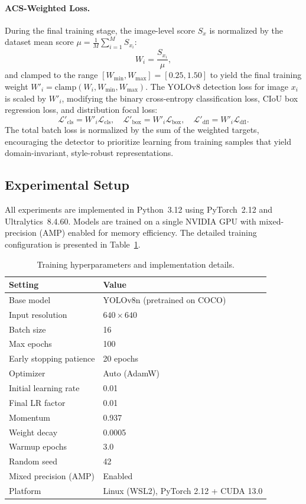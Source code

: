 \documentclass[12pt,a4paper]{article}
\begin{document}
\paragraph{ACS-Weighted Loss.}
During the final training stage, the image-level score $S_x$ is normalized by the dataset mean score $\mu = \frac{1}{M} \sum_{i=1}^M S_{x_i}$:
\begin{equation}
    W_i = \frac{S_{x_i}}{\mu},
\end{equation}
and clamped to the range $[W_{\text{min}}, W_{\text{max}}] = [0.25, 1.50]$ to yield the final training weight $W'_i = \text{clamp}(W_i, W_{\text{min}}, W_{\text{max}})$. The YOLOv8 detection loss for image $x_i$ is scaled by $W'_i$, modifying the binary cross-entropy classification loss, CIoU box regression loss, and distribution focal loss:
\begin{equation}
    \mathcal{L}'_{\text{cls}} = W'_i \mathcal{L}_{\text{cls}}, \quad \mathcal{L}'_{\text{box}} = W'_i \mathcal{L}_{\text{box}}, \quad \mathcal{L}'_{\text{dfl}} = W'_i \mathcal{L}_{\text{dfl}}.
\end{equation}
The total batch loss is normalized by the sum of the weighted targets, encouraging the detector to prioritize learning from training samples that yield domain-invariant, style-robust representations.


\subsection{Experimental Setup}

All experiments are implemented in Python~3.12 using PyTorch~2.12 and Ultralytics~8.4.60. Models are trained on a single NVIDIA GPU with mixed-precision (AMP) enabled for memory efficiency. The detailed training configuration is presented in Table~\ref{tab:training_settings}.

\begin{table}[H]
\centering
\caption{Training hyperparameters and implementation details.}
\label{tab:training_settings}
\begin{tabular}{ll}
\toprule
\textbf{Setting} & \textbf{Value} \\
\midrule
Base model & YOLOv8n (pretrained on COCO) \\
Input resolution & $640 \times 640$ \\
Batch size & 16 \\
Max epochs & 100 \\
Early stopping patience & 20 epochs \\
Optimizer & Auto (AdamW) \\
Initial learning rate & 0.01 \\
Final LR factor & 0.01 \\
Momentum & 0.937 \\
Weight decay & 0.0005 \\
Warmup epochs & 3.0 \\
Random seed & 42 \\
Mixed precision (AMP) & Enabled \\
Platform & Linux (WSL2), PyTorch 2.12 + CUDA 13.0 \\
\bottomrule
\end{tabular}
\end{table}
\end{document}
